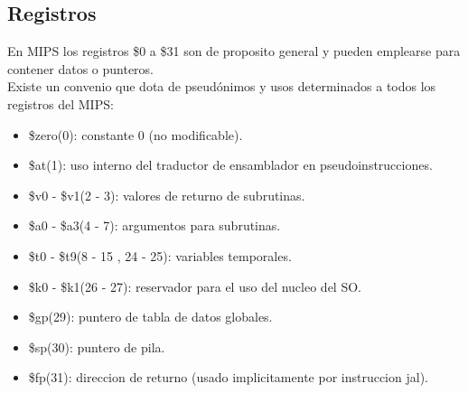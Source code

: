 \documentclass[12pt]{article}
\begin{document}
\subsection{Registros}
En MIPS los registros \$0 a \$31 son de proposito general y pueden emplearse
para contener datos o punteros.\\
Existe un convenio que dota de pseudónimos y usos determinados a todos los
registros del MIPS:
\begin{itemize}
\item \$zero(0): constante 0 (no modificable).
\item \$at(1): uso interno del traductor de ensamblador en pseudoinstrucciones.
\item \$v0 - \$v1(2 - 3): valores de returno de subrutinas.
\item \$a0 - \$a3(4 - 7): argumentos para subrutinas.
\item \$t0 - \$t9(8 - 15 , 24 - 25): variables temporales.
\item \$k0 - \$k1(26 - 27): reservador para el uso del nucleo del SO.
\item \$gp(29): puntero de tabla de datos globales.
\item \$sp(30): puntero de pila.
\item \$fp(31): direccion de returno (usado implicitamente por instruccion jal).

\end{itemize}
\end{document}
